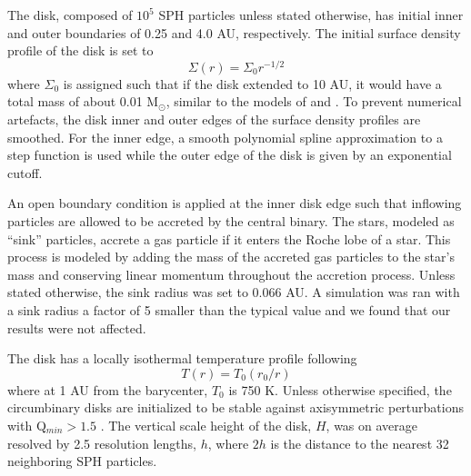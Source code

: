 The disk, composed of $10^5$ SPH particles unless stated otherwise, has initial inner and outer boundaries of 0.25 and 4.0 AU,
respectively.  The initial surface density profile of the disk is set to 
\begin{equation}
\Sigma(r) = \Sigma_0 r^{-1/2}
\end{equation}
 where $\Sigma_0$ is assigned such that if the disk extended to 10 AU, it would have a total mass of about 0.01 
M$_{\odot}$, similar to the models of \citet{Pierens2007} and \citet{Kley2014}.  To prevent numerical 
artefacts, the disk inner and outer edges of the surface density profiles are smoothed.  For the inner edge, a smooth polynomial spline approximation to a step function is used while the outer edge of the disk is given by an exponential cutoff.
 
An open boundary condition is applied at the inner disk edge such that inflowing particles are allowed to be accreted
by the central binary.  The stars, modeled as ``sink'' particles, accrete a gas particle if it enters the Roche lobe of a star.  This process is modeled by adding the mass of the accreted gas particles to the star's mass and conserving linear momentum throughout the accretion process.  Unless stated otherwise, the 
sink radius was set to 0.066 AU.  A simulation was ran with a sink radius a factor of 5 smaller than the typical value and we found that our results were not 
affected.
 
The disk has a locally isothermal temperature profile following 
\begin{equation}
\label{CBDisk:eqn:disc_temp_profile}
T(r) = T_0(r_0/r)
\end{equation}
where at 1 AU from the barycenter, $T_0$ is
750 K.  Unless otherwise specified, the circumbinary disks are initialized to be stable against axisymmetric perturbations with Q$_{min} > 1.5$ \citep{Toomre1964}.
The vertical scale height of the disk, $H$, was on average resolved by
  2.5 resolution lengths, $h$, where $2 h$ is the distance
to the nearest 32 neighboring SPH particles.

